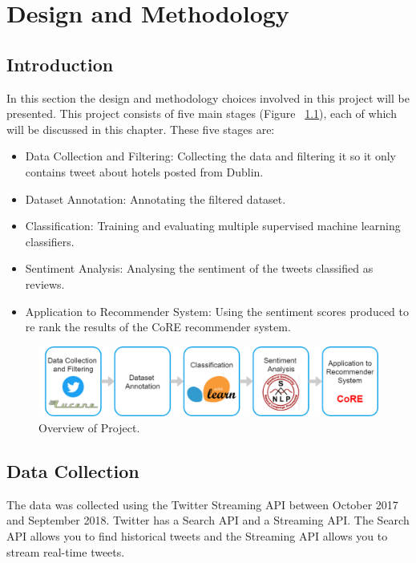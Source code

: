 \chapter{Design and Methodology}

\section{Introduction}

In this section the design and methodology choices involved in this project will be presented. This project consists of five main stages (Figure ~\ref{fig:pipeline}), each of which will be discussed in this chapter. These five stages are:
\begin{itemize}
    \item Data Collection and Filtering: Collecting the data and filtering it so it only contains tweet about hotels posted from Dublin.
    \item Dataset Annotation: Annotating the filtered dataset.
    \item Classification: Training and evaluating multiple supervised machine learning classifiers.
    \item Sentiment Analysis: Analysing the sentiment of the tweets classified as reviews.
    \item Application to Recommender System: Using the sentiment scores produced to re rank the results of the CoRE recommender system.
\end{itemize}

\begin{figure}[h!]
\centering
\includegraphics[width=1\textwidth]{design_and_methodology/pipeline.png}
\caption{\label{fig:pipeline} Overview of Project.}
\end{figure}

\section{Data Collection}
The data was collected using the Twitter Streaming API between October 2017 and September 2018. Twitter has a Search API and a Streaming API. The Search API allows you to find historical tweets and the Streaming API allows you to stream real-time tweets.

